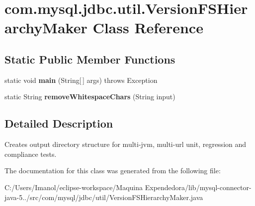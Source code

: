 \hypertarget{classcom_1_1mysql_1_1jdbc_1_1util_1_1_version_f_s_hierarchy_maker}{}\section{com.\+mysql.\+jdbc.\+util.\+Version\+F\+S\+Hierarchy\+Maker Class Reference}
\label{classcom_1_1mysql_1_1jdbc_1_1util_1_1_version_f_s_hierarchy_maker}
\subsection*{Static Public Member Functions}
\begin{DoxyCompactItemize}
\item 
\mbox{\label{classcom_1_1mysql_1_1jdbc_1_1util_1_1_version_f_s_hierarchy_maker_a18282ae8ef357fa9dbd0d4f5924b6165}} 
static void {\bfseries main} (String\mbox{[}$\,$\mbox{]} args)  throws Exception 
\item 
\mbox{\label{classcom_1_1mysql_1_1jdbc_1_1util_1_1_version_f_s_hierarchy_maker_abcedce179da62c7ab0e14139e5af40a1}} 
static String {\bfseries remove\+Whitespace\+Chars} (String input)
\end{DoxyCompactItemize}


\subsection{Detailed Description}
Creates output directory structure for multi-\/jvm, multi-\/url unit, regression and compliance tests. 

The documentation for this class was generated from the following file\+:\begin{DoxyCompactItemize}
\item 
C\+:/\+Users/\+Imanol/eclipse-\/workspace/\+Maquina Expendedora/lib/mysql-\/connector-\/java-\/5../src/com/mysql/jdbc/util/Version\+F\+S\+Hierarchy\+Maker.\+java\end{DoxyCompactItemize}

